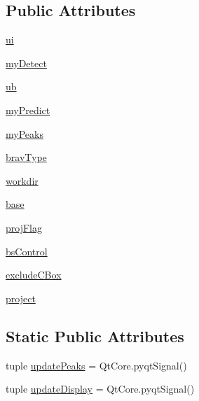 \subsection*{Public Attributes}
\begin{DoxyCompactItemize}
\item 
\hyperlink{classsimulate_dlg_1_1simulate_dlg_a23a3d39d70f0ae6ce8a838fe680afd08}{ui}
\item 
\hyperlink{classsimulate_dlg_1_1simulate_dlg_ad2226009f457b82889ed337b1ed49e4b}{my\-Detect}
\item 
\hyperlink{classsimulate_dlg_1_1simulate_dlg_a5aa51d22e30acd26145131e848e30759}{ub}
\item 
\hyperlink{classsimulate_dlg_1_1simulate_dlg_afb873a7d23504a37dc242405343f64aa}{my\-Predict}
\item 
\hyperlink{classsimulate_dlg_1_1simulate_dlg_a714be7d1a5fb648271c987444d5be3c4}{my\-Peaks}
\item 
\hyperlink{classsimulate_dlg_1_1simulate_dlg_aed2a79b17c8c625b06bad686996395e8}{brav\-Type}
\item 
\hyperlink{classsimulate_dlg_1_1simulate_dlg_a217be5c43518b4f44ac9f9397e4cd155}{workdir}
\item 
\hyperlink{classsimulate_dlg_1_1simulate_dlg_a37752b91546a36f94ff8e4dedee83518}{base}
\item 
\hyperlink{classsimulate_dlg_1_1simulate_dlg_a6b8afedfdaab0461117c61cde727aa2d}{proj\-Flag}
\item 
\hyperlink{classsimulate_dlg_1_1simulate_dlg_a2b03e2e70fbf25c638c1e0466a2de38f}{bs\-Control}
\item 
\hyperlink{classsimulate_dlg_1_1simulate_dlg_a2adb9273893575b3120e8878a99983d4}{exclude\-C\-Box}
\item 
\hyperlink{classsimulate_dlg_1_1simulate_dlg_a723b0e1c3aa3f071ae84ec39a1558845}{project}
\end{DoxyCompactItemize}
\subsection*{Static Public Attributes}
\begin{DoxyCompactItemize}
\item 
tuple \hyperlink{classsimulate_dlg_1_1simulate_dlg_a14c3146ee7422f53d8488a114344800e}{update\-Peaks} = Qt\-Core.\-pyqt\-Signal()
\item 
tuple \hyperlink{classsimulate_dlg_1_1simulate_dlg_a1c6d77c7b4759cb95a7fbdd5a7ca23d7}{update\-Display} = Qt\-Core.\-pyqt\-Signal()
\end{DoxyCompactItemize}


